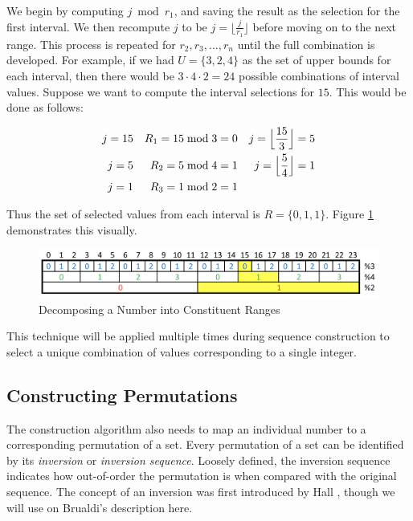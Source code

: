 We begin by computing $j \bmod r_1$, and saving the result as the selection for the first interval. We then recompute $j$ to be $j = \lfloor \frac{j}{r_1} \rfloor$ before moving on to the next range. This process is repeated for $r_2,r_3,...,r_n$ until the full combination is developed. For example, if we had $U = \{3, 2, 4\}$ as the set of upper bounds for each interval, then there would be $3 \cdot 4 \cdot 2 = 24$ possible combinations of interval values. Suppose we want to compute the interval selections for $15$. This would be done as follows:

\begin{align*}
j = 15   &&  R_1 = 15 \bmod 3 = 0  &&  j = \Bigl\lfloor \frac{15}{3} \Bigr\rfloor = 5   \\
j = 5    &&  R_2 = 5 \bmod 4 = 1   &&  j = \Bigl\lfloor \frac{5}{4} \Bigr\rfloor = 1    \\
j = 1    &&  R_3 = 1 \bmod 2 = 1   &&                                                   \\
\end{align*}

Thus the set of selected values from each interval is $R = \{0, 1, 1\}$. Figure \ref{fig:interval_breakdown} demonstrates this visually.

\begin{figure}[htb]
\centering
\centerline{\includegraphics[origin=c,width=12cm]{../figures/interval-breakdown-final.png}}
\caption{Decomposing a Number into Constituent Ranges}
\label{fig:interval_breakdown}
\end{figure}

This technique will be applied multiple times during sequence construction to select a unique combination of values corresponding to a single integer.

\subsection{Constructing Permutations}

The construction algorithm also needs to map an individual number to a corresponding permutation of a set. Every permutation of a set can be identified by its \textit{inversion} or \textit{inversion sequence}. Loosely defined, the inversion sequence indicates how out-of-order the permutation is when compared with the original sequence. The concept of an inversion was first introduced by Hall \cite{hall_automorphisms_1962}, though we will use on Brualdi's description \cite{brualdi_introductory_2010} here.

